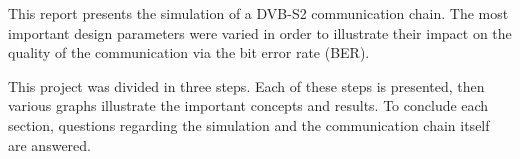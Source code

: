 This report presents the simulation of a DVB-S2 communication chain. The most important design parameters were varied in order to illustrate their impact on the quality of the communication via the bit error rate (BER).

This project was divided in three steps. Each of these steps is presented, then various graphs illustrate the important concepts and results. To conclude each section, questions regarding the simulation and the communication chain itself are answered.